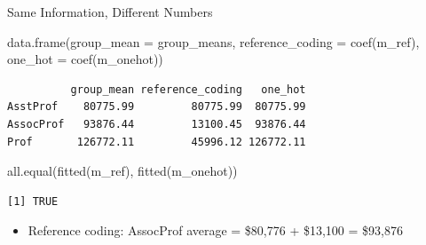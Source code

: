 \documentclass[
  ignorenonframetext,
  aspectratio=169,
]{beamer}
\newenvironment{Shaded}{\begin{snugshade}}{\end{snugshade}}
\newcommand{\AttributeTok}[1]{\textcolor[rgb]{0.40,0.45,0.13}{#1}}
\newcommand{\FunctionTok}[1]{\textcolor[rgb]{0.28,0.35,0.67}{#1}}
\newcommand{\NormalTok}[1]{\textcolor[rgb]{0.00,0.23,0.31}{#1}}
\providecommand{\tightlist}{%
  \setlength{\itemsep}{0pt}\setlength{\parskip}{0pt}}\usepackage{longtable,booktabs,array}
\begin{document}
\begin{frame}[fragile]{Same Information, Different Numbers}
\protect\hypertarget{same-information-different-numbers}{}
\begin{Shaded}
\begin{Highlighting}[]
\FunctionTok{data.frame}\NormalTok{(}\AttributeTok{group\_mean       =}\NormalTok{ group\_means,}
           \AttributeTok{reference\_coding =} \FunctionTok{coef}\NormalTok{(m\_ref),}
           \AttributeTok{one\_hot          =} \FunctionTok{coef}\NormalTok{(m\_onehot))}
\end{Highlighting}
\end{Shaded}

\begin{verbatim}
          group_mean reference_coding   one_hot
AsstProf    80775.99         80775.99  80775.99
AssocProf   93876.44         13100.45  93876.44
Prof       126772.11         45996.12 126772.11
\end{verbatim}

\begin{Shaded}
\begin{Highlighting}[]
\FunctionTok{all.equal}\NormalTok{(}\FunctionTok{fitted}\NormalTok{(m\_ref), }\FunctionTok{fitted}\NormalTok{(m\_onehot))}
\end{Highlighting}
\end{Shaded}

\begin{verbatim}
[1] TRUE
\end{verbatim}

\begin{itemize}
\tightlist
\item
  Reference coding: AssocProf average = \$80,776 + \$13,100 = \$93,876
\end{itemize}
\end{frame}
\end{document}
